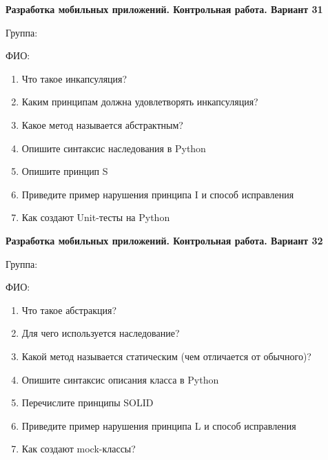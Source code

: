 \documentclass[12pt]{article}
\begin{document}
\vspace{40pt}\begin{minipage}{\textwidth}
\textbf{Разработка мобильных приложений. Контрольная работа. Вариант 31}

Группа: \underline{\hspace{3cm}}

ФИО: \underline{\hspace{10cm}}

\begin{enumerate}
\item Что такое инкапсуляция?
\item Каким принципам должна удовлетворять инкапсуляция?
\item Какое метод называется абстрактным?
\item Опишите синтаксис наследования в Python
\item Опишите принцип S
\item Приведите пример нарушения принципа I и способ исправления
\item Как создают Unit-тесты на Python

\end{enumerate}
\end{minipage}

\vspace{40pt}\begin{minipage}{\textwidth}
\textbf{Разработка мобильных приложений. Контрольная работа. Вариант 32}

Группа: \underline{\hspace{3cm}}

ФИО: \underline{\hspace{10cm}}

\begin{enumerate}
\item Что такое абстракция?
\item Для чего используется наследование?
\item Какой метод называется статическим (чем отличается от обычного)?
\item Опишите синтаксис описания класса в Python
\item Перечислите принципы SOLID
\item Приведите пример нарушения принципа L и способ исправления
\item Как создают mock-классы?

\end{enumerate}
\end{minipage}
\end{document}
